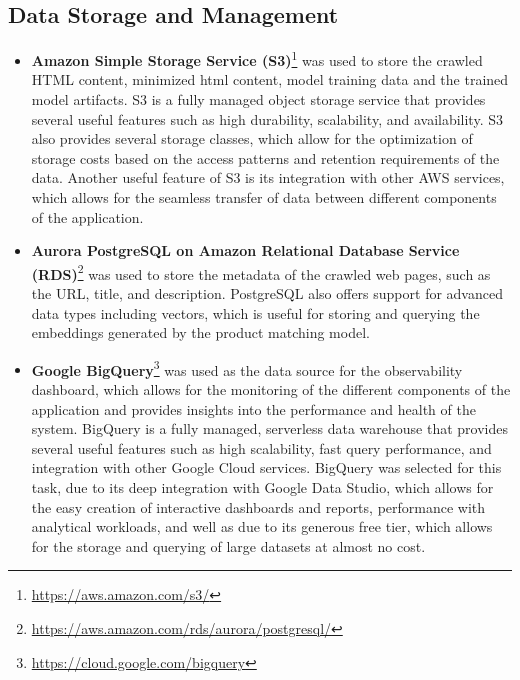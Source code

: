 \subsection{Data Storage and Management}\label{subsec:data_storage_and_management}
\begin{itemize}
    \item \textbf{Amazon Simple Storage Service (S3)}\footnote{\url{https://aws.amazon.com/s3/}} was used to store the crawled HTML content, minimized html content, model training data and the trained model artifacts.
    S3 is a fully managed object storage service that provides several useful features such as high durability, scalability, and availability.
    S3 also provides several storage classes, which allow for the optimization of storage costs based on the access patterns and retention requirements of the data.
    Another useful feature of S3 is its integration with other AWS services, which allows for the seamless transfer of data between different components of the application.
    \item \textbf{Aurora PostgreSQL on Amazon Relational Database Service (RDS)}\footnote{\url{https://aws.amazon.com/rds/aurora/postgresql/}} was used to store the metadata of the crawled web pages, such as the URL, title, and description.
    PostgreSQL also offers support for advanced data types including vectors, which is useful for storing and querying the embeddings generated by the product matching model.
    \item \textbf{Google BigQuery}\footnote{\url{https://cloud.google.com/bigquery}} was used as the data source for the observability dashboard, which allows for the monitoring of the different components of the application and provides insights into the performance and health of the system.
    BigQuery is a fully managed, serverless data warehouse that provides several useful features such as high scalability, fast query performance, and integration with other Google Cloud services.
    BigQuery was selected for this task, due to its deep integration with Google Data Studio, which allows for the easy creation of interactive dashboards and reports, performance with analytical workloads, and well as due to its generous free tier, which allows for the storage and querying of large datasets at almost no cost.
\end{itemize}


